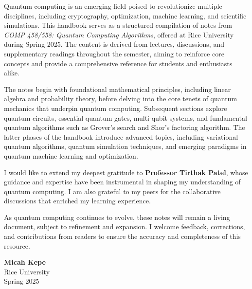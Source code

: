 Quantum computing is an emerging field poised to revolutionize multiple
disciplines, including cryptography, optimization, machine learning, and
scientific simulations. This handbook serves as a structured compilation of
notes from \textit{COMP 458/558: Quantum Computing Algorithms}, offered at Rice
University during Spring 2025. The content is derived from lectures,
discussions, and supplementary readings throughout the semester, aiming to
reinforce core concepts and provide a comprehensive reference for students
and enthusiasts alike.

\vspace{0.3cm}

\noindent
The notes begin with foundational mathematical principles, including linear
algebra and probability theory, before delving into the core tenets of
quantum mechanics that underpin quantum computing. Subsequent sections
explore quantum circuits, essential quantum gates, multi-qubit systems, and
fundamental quantum algorithms such as Grover’s search and Shor’s factoring
algorithm. The latter phases of the handbook introduce advanced topics,
including variational quantum algorithms, quantum simulation techniques, and
emerging paradigms in quantum machine learning and optimization.

\vspace{0.3cm}

\noindent
I would like to extend my deepest gratitude to \textbf{Professor Tirthak Patel},
whose guidance and expertise have been instrumental in shaping my
understanding of quantum computing. I am also grateful to my peers for the
collaborative discussions that enriched my learning experience.

\vspace{0.3cm}

\noindent
As quantum computing continues to evolve, these notes will remain a living
document, subject to refinement and expansion. I welcome feedback,
corrections, and contributions from readers to ensure the accuracy and
completeness of this resource.

\vspace{1cm}

\noindent \textbf{Micah Kepe}  \\
Rice University  \\
Spring 2025
